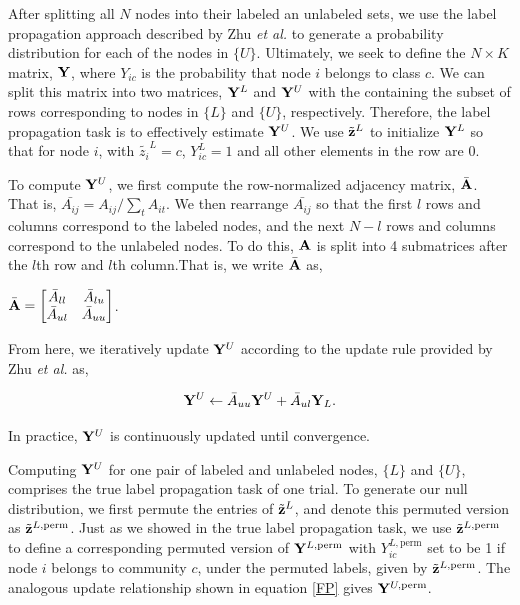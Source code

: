 \indent After splitting all $N$ nodes into their labeled an unlabeled sets, we use the label propagation approach described by Zhu \emph{et al.} \cite{learning2} to generate a probability distribution for each of the nodes in $\{U\}$. Ultimately, we seek to define the $N \times K$ matrix, ${\bf Y}$, where $Y_{ic}$ is the probability that node $i$ belongs to class $c$. We can split this matrix into two matrices, ${\bf Y}^{L}$ and ${\bf Y}^{U}$ with the containing the subset of rows corresponding to nodes in $\{L\}$ and $\{U\}$, respectively. Therefore, the label propagation task is to effectively estimate ${\bf Y}^{U}$. We use $\tilde{{\bf z}}^{L}$ to initialize ${\bf Y}^{L}$ so that for node $i$, with $\tilde{{z}_{i}}^{L}=c$, $Y^{L}_{ic}=1$ and all other elements in the row are 0.   

 To compute ${\bf Y}^{U}$, we first compute the row-normalized adjacency matrix, ${\bar{\bf A}}$. That is, $\bar{A_{ij}}=A_{ij}/\sum_{t}A_{it}$. We then rearrange $\bar{A_{ij}}$ so that the first $l$ rows and columns correspond to the labeled nodes, and the next $N-l$ rows and columns correspond to the unlabeled nodes. To do this, ${\bf A}$ is split into 4 submatrices after the $l$th row and $l$th column.That is, we write ${\bar{\bf A}}$ as,
 
${\bar{\bf A}}=
\begin{bmatrix}
 \bar{A}_{ll} & \bar{A}_{lu} \\
 \bar{A}_{ul} & \bar{A}_{uu} \\
 \end{bmatrix}$.
 
 From here, we iteratively update ${\bf Y}^{U}$ according to the update rule provided by Zhu \emph{et al.} \cite{learning2} as,
 
 \begin{equation}
 \label{FP}
 {\bf Y}^{U} \leftarrow {\bar A}_{uu}{\bf Y}^{U}+{\bar A}_{ul}{\bf Y}_{L}.
 \end{equation}
 
 In practice, ${\bf Y}^{U}$ is continuously updated until convergence. 
 
Computing ${\bf Y}^{U}$ for one pair of labeled and unlabeled nodes, $\{L\}$ and $\{U\}$, comprises the true label propagation task of one trial. To generate our null distribution, we first permute the entries of $\tilde{{\bf z}}^{L}$, and denote this permuted version as $\tilde{{\bf z}}^{L,\text{perm}}$. Just as we showed in the true label propagation task, we use $\tilde{{\bf z}}^{L,\text{perm}}$ to define a corresponding permuted version of ${\bf Y}^{L,\text{perm}}$ with $Y^{L,\text{perm}}_{ic}$ set to be 1 if node $i$ belongs to community $c$, under the permuted labels, given by $\tilde{{\bf z}}^{L,\text{perm}}$. The analogous update relationship shown in equation \ref{FP} gives ${\bf Y}^{U,\text{perm}}$. 
 
